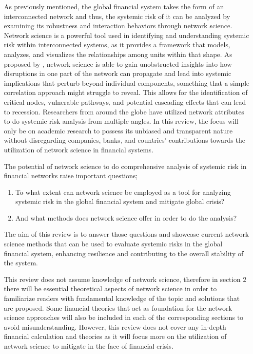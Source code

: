 \documentclass[a4paper,11pt]{article}
\begin{document}
As previously mentioned, the global financial system takes the form of an interconnected network and thus, the systemic risk of it can be analyzed by examining its robustness and interaction behaviors through network science. Network science is a powerful tool used in identifying and understanding systemic risk within interconnected systems, as it provides a framework that models, analyzes, and visualizes the relationships among units within that shape. As proposed by \cite{Patro_Qi_Sun_2013}, network science is able to gain unobstructed insights into how disruptions in one part of the network can propagate and lead into systemic implications that perturb beyond individual components, something that a simple correlation approach might struggle to reveal. This allows for the identification of critical nodes, vulnerable pathways, and potential cascading effects that can lead to recession. Researchers from around the globe have utilized network attributes to do systemic risk analysis from multiple angles. In this review, the focus will only be on academic research to possess  its unbiased and transparent nature without disregarding companies, banks, and countries’ contributions towards the utilization of network science in financial systems.

The potential of network science to do comprehensive analysis of systemic risk in financial networks raise important questions;
\begin{enumerate}
    \item To what extent can network science be employed as a tool for analyzing systemic risk in the global financial system and mitigate global crisis? 
    \item And what methods does network science offer in order to do the analysis? 
\end{enumerate}
The aim of this review is to answer those questions and showcase current network science methods that can be used to evaluate systemic risks in the global financial system, enhancing resilience and contributing to the overall stability of the system.

This review does not assume knowledge of network science, therefore in section 2 there will be essential theoretical aspects of network science in order to familiarize readers with fundamental knowledge of the topic and solutions that are proposed. Some financial theories that act as foundation for the network science approaches will also be included in each of the corresponding sections to avoid misunderstanding. However, this review does not cover any in-depth financial calculation and theories as it will focus more on the utilization of network science to mitigate in the face of financial crisis.
\end{document}
